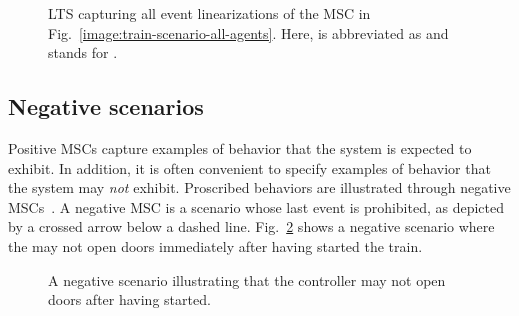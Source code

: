 \begin{figure}\centering
{}
\caption{LTS capturing all event linearizations of the MSC in Fig.~\ref{image:train-scenario-all-agents}. Here,  is abbreviated as  and  stands for . \label{image:msc-linearizations}}
\end{figure}

\subsection{Negative scenarios\label{subsection:background-negative-scenarios}}

Positive MSCs capture examples of behavior that the system is expected to exhibit. In addition, it is often convenient to specify examples of behavior that the system may \emph{not} exhibit. Proscribed behaviors are illustrated through negative MSCs~\cite{Uchitel:2002, Uchitel:2004}. A negative MSC is a scenario whose last event is prohibited, as depicted by a crossed arrow below a dashed line. Fig.~\ref{image:train-negative-scenario} shows a negative scenario where the  may not open doors immediately after having started the train.

\begin{figure}\centering
{}
\caption{A negative scenario illustrating that the controller may not open doors after having started.\label{image:train-negative-scenario}}
\end{figure}

